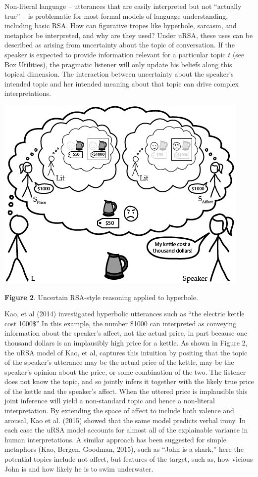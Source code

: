 \documentclass[]{elsarticle}
\begin{document}
Non-literal language -- utterances that are easily interpreted but not
``actually true'' -- is problematic for most formal models of language
understanding, including basic RSA. How can figurative tropes like
hyperbole, sarcasm, and metaphor be interpreted, and why are they used?
Under uRSA, these uses can be described as arising from uncertainty
about the topic of conversation. If the speaker is expected to provide
information relevant for a particular topic $t$ (see Box Utilities),
the pragmatic listener will only update his beliefs along this topical
dimension. The interaction between uncertainty about the speaker's
intended topic and her intended meaning about that topic can drive
complex interpretations.

\includegraphics{images/media/image03.png}

\textbf{Figure 2}. Uncertain RSA-style reasoning applied to hyperbole.

Kao, et al (2014) investigated hyperbolic utterances such as ``the
electric kettle cost 1000\$'' In this example, the number \$1000 can
interpreted as conveying information about the speaker's affect, not the
actual price, in part because one thousand dollars is an implausibly
high price for a kettle. As shown in Figure 2, the uRSA model of Kao, et
al, captures this intuition by positing that the topic of the speaker's
utterance may be the actual price of the kettle, may be the speaker's
opinion about the price, or some combination of the two. The listener
does not know the topic, and so jointly infers it together with the
likely true price of the kettle and the speaker's affect. When the
uttered price is implausible this joint inference will yield a
non-standard topic and hence a non-literal interpretation. By extending
the space of affect to include both valence and arousal, Kao et al.
(2015) showed that the same model predicts verbal irony. In each case
the uRSA model accounts for almost all of the explainable variance in
human interpretations. A similar approach has been suggested for simple
metaphors (Kao, Bergen, Goodman, 2015), such as ``John is a shark,''
here the potential topics include not affect, but features of the
target, such as, how vicious John is and how likely he is to swim
underwater.
\end{document}
